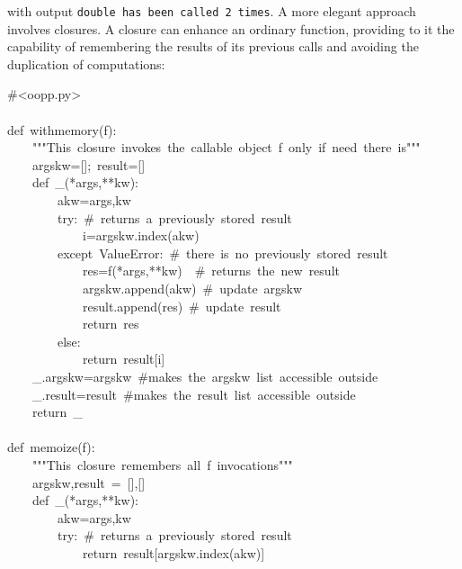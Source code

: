 \documentclass[10pt,english]{article}
\begin{document}
with output \texttt{double has been called 2 times}.
A more elegant approach involves closures. A closure can enhance an
ordinary function, providing to it the capability of remembering 
the results of its previous calls and avoiding the duplication of
computations:
\begin{ttfamily}\begin{flushleft}
\mbox{{\#}<oopp.py>}\\
\mbox{}\\
\mbox{def~withmemory(f):}\\
\mbox{~~~~"""This~closure~invokes~the~callable~object~f~only~if~need~there~is"""}\\
\mbox{~~~~argskw=[];~result=[]}\\
\mbox{~~~~def~{\_}(*args,**kw):~}\\
\mbox{~~~~~~~~akw=args,kw}\\
\mbox{~~~~~~~~try:~{\#}~returns~a~previously~stored~result}\\
\mbox{~~~~~~~~~~~~i=argskw.index(akw)}\\
\mbox{~~~~~~~~except~ValueError:~{\#}~there~is~no~previously~stored~result}\\
\mbox{~~~~~~~~~~~~res=f(*args,**kw)~~{\#}~returns~the~new~result}\\
\mbox{~~~~~~~~~~~~argskw.append(akw)~{\#}~update~argskw}\\
\mbox{~~~~~~~~~~~~result.append(res)~{\#}~update~result}\\
\mbox{~~~~~~~~~~~~return~res}\\
\mbox{~~~~~~~~else:}\\
\mbox{~~~~~~~~~~~~return~result[i]~~}\\
\mbox{~~~~{\_}.argskw=argskw~{\#}makes~the~argskw~list~accessible~outside}\\
\mbox{~~~~{\_}.result=result~{\#}makes~the~result~list~accessible~outside}\\
\mbox{~~~~return~{\_}}\\
\mbox{}\\
\mbox{def~memoize(f):}\\
\mbox{~~~~"""This~closure~remembers~all~f~invocations"""}\\
\mbox{~~~~argskw,result~=~[],[]}\\
\mbox{~~~~def~{\_}(*args,**kw):~}\\
\mbox{~~~~~~~~akw=args,kw}\\
\mbox{~~~~~~~~try:~{\#}~returns~a~previously~stored~result}\\
\mbox{~~~~~~~~~~~~return~result[argskw.index(akw)]}\\

\end{flushleft}
\end{ttfamily}
\end{document}
